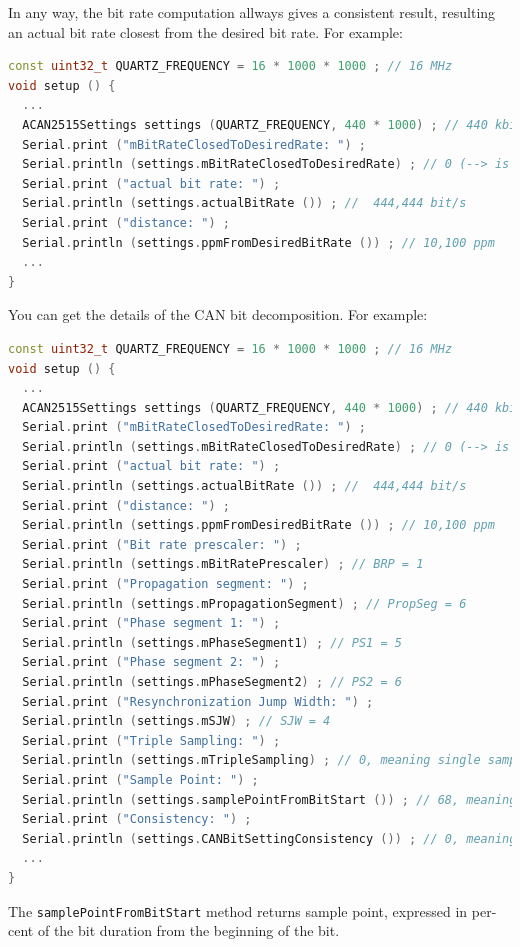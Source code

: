 \documentclass[10pt, a4paper, obeyspaces, openany]{extarticle}
\begin{document}
In any way, the bit rate computation allways gives a consistent result, resulting an actual bit rate closest from the desired bit rate. For example:
{ \small\begin{lstlisting}[language=c++]
const uint32_t QUARTZ_FREQUENCY = 16 * 1000 * 1000 ; // 16 MHz
void setup () {
  ...
  ACAN2515Settings settings (QUARTZ_FREQUENCY, 440 * 1000) ; // 440 kbit/s 
  Serial.print ("mBitRateClosedToDesiredRate: ") ;
  Serial.println (settings.mBitRateClosedToDesiredRate) ; // 0 (--> is false)
  Serial.print ("actual bit rate: ") ;
  Serial.println (settings.actualBitRate ()) ; //  444,444 bit/s
  Serial.print ("distance: ") ;
  Serial.println (settings.ppmFromDesiredBitRate ()) ; // 10,100 ppm
  ...
}
\end{lstlisting}}

You can get the details of the CAN bit decomposition. For example:

{ \small\begin{lstlisting}[language=c++]
const uint32_t QUARTZ_FREQUENCY = 16 * 1000 * 1000 ; // 16 MHz
void setup () {
  ...
  ACAN2515Settings settings (QUARTZ_FREQUENCY, 440 * 1000) ; // 440 kbit/s 
  Serial.print ("mBitRateClosedToDesiredRate: ") ;
  Serial.println (settings.mBitRateClosedToDesiredRate) ; // 0 (--> is false)
  Serial.print ("actual bit rate: ") ;
  Serial.println (settings.actualBitRate ()) ; //  444,444 bit/s
  Serial.print ("distance: ") ;
  Serial.println (settings.ppmFromDesiredBitRate ()) ; // 10,100 ppm
  Serial.print ("Bit rate prescaler: ") ;
  Serial.println (settings.mBitRatePrescaler) ; // BRP = 1
  Serial.print ("Propagation segment: ") ;
  Serial.println (settings.mPropagationSegment) ; // PropSeg = 6
  Serial.print ("Phase segment 1: ") ;
  Serial.println (settings.mPhaseSegment1) ; // PS1 = 5
  Serial.print ("Phase segment 2: ") ;
  Serial.println (settings.mPhaseSegment2) ; // PS2 = 6
  Serial.print ("Resynchronization Jump Width: ") ;
  Serial.println (settings.mSJW) ; // SJW = 4
  Serial.print ("Triple Sampling: ") ;
  Serial.println (settings.mTripleSampling) ; // 0, meaning single sampling
  Serial.print ("Sample Point: ") ;
  Serial.println (settings.samplePointFromBitStart ()) ; // 68, meaning 68%
  Serial.print ("Consistency: ") ;
  Serial.println (settings.CANBitSettingConsistency ()) ; // 0, meaning Ok
  ...
}
\end{lstlisting}}

The \texttt{samplePointFromBitStart} method returns sample point, expressed in per-cent of the bit duration from the beginning of the bit.
\end{document}
